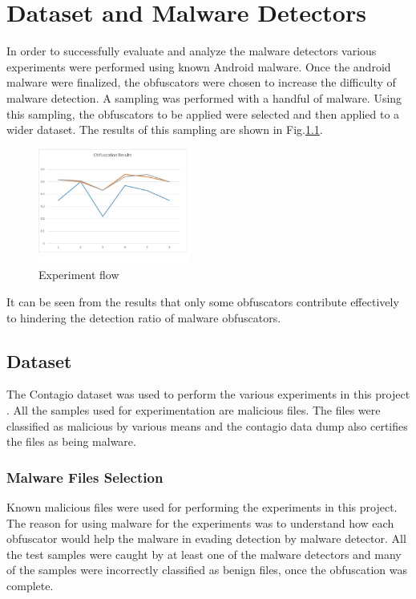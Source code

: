 \chapter{Dataset and Malware Detectors}

In order to successfully evaluate and analyze the malware detectors various experiments were performed using known Android malware. Once the android malware were finalized, the obfuscators were chosen to increase the difficulty of malware detection. A sampling was performed with a handful of malware. Using this sampling, the obfuscators to be applied were selected and then applied to a wider dataset. The results of this sampling are shown in Fig.\ref{sampling}.

 \begin{figure}[sampling]
 	\centering
 	\includegraphics[width=50mm]{sampling.jpg}
 	\caption{Experiment flow}
 	\label{sampling}
 \end{figure}
 
 It can be seen from the results that only some obfuscators contribute effectively to hindering the detection ratio of malware obfuscators.
 
 \section{Dataset}
	 The Contagio dataset was used to perform the various experiments in this project \cite{contagio}. All the samples used for experimentation are malicious files. The files were classified as malicious by various means and the contagio data dump also certifies the files as being malware.
	 
	\subsection{Malware Files Selection}
		Known malicious files were used for performing the experiments in this project. The reason for using malware for the experiments was to understand how each obfuscator would help the malware in evading detection by malware detector. All the test samples were caught by at least one of the malware detectors and many of the samples were incorrectly classified as benign files, once the obfuscation was complete.

